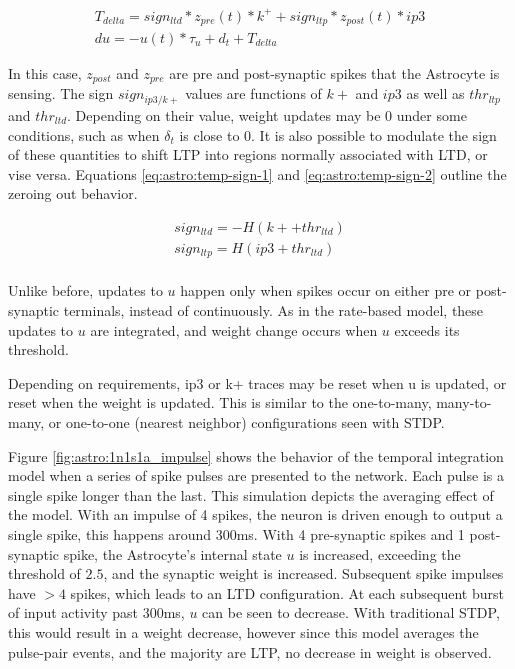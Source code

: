    \begin{align}
      T_{delta} = sign_{ltd} * z_{pre}(t) * k^+ + sign_{ltp} * z_{post}(t) * ip3 \\
      du = -u(t) * \tau_u + d_t + T_{delta} \label{eq:astro:temp-u}
    \end{align}

    In this case, $z_{post}$ and $z_{pre}$ are pre and post-synaptic spikes that
    the Astrocyte is sensing. The sign $sign_{ip3/k+}$ values are functions of $k+$ and
    $ip3$ as well as $thr_{ltp}$ and $thr_{ltd}$. Depending on their value,
    weight updates may be 0 under some conditions, such as when $\delta_t$ is
    close to 0. It is also possible to modulate the sign of these quantities to
    shift LTP into regions normally associated with LTD, or vise
    versa. Equations \ref{eq:astro:temp-sign-1} and \ref{eq:astro:temp-sign-2}
    outline the zeroing out behavior.

    \begin{align}
      sign_{ltd} = -H(k+ + thr_{ltd}) \\
      sign_{ltp} = H(ip3 + thr_{ltd}) \\
    \end{align}

    Unlike before, updates to $u$ happen only when spikes occur on either pre or
    post-synaptic terminals, instead of continuously. As in the rate-based
    model, these updates to $u$ are integrated, and weight change occurs when
    $u$ exceeds its threshold.

    Depending on requirements, ip3 or k+ traces may be reset when u is updated,
    or reset when the weight is updated. This is similar to the one-to-many,
    many-to-many, or one-to-one (nearest neighbor) configurations seen with
    STDP.

    Figure \ref{fig:astro:1n1s1a_impulse} shows the behavior of the temporal
    integration model when a series of spike pulses are presented to the
    network. Each pulse is a single spike longer than the last. This simulation
    depicts the averaging effect of the model. With an impulse of 4 spikes, the
    neuron is driven enough to output a single spike, this happens around
    300ms. With 4 pre-synaptic spikes and 1 post-synaptic spike, the Astrocyte's
    internal state $u$ is increased, exceeding the threshold of $2.5$, and the
    synaptic weight is increased. Subsequent spike impulses have $>4$ spikes,
    which leads to an LTD configuration. At each subsequent burst of input
    activity past 300ms, $u$ can be seen to decrease. With traditional STDP,
    this would result in a weight decrease, however since this model averages
    the pulse-pair events, and the majority are LTP, no decrease in weight is
    observed.

